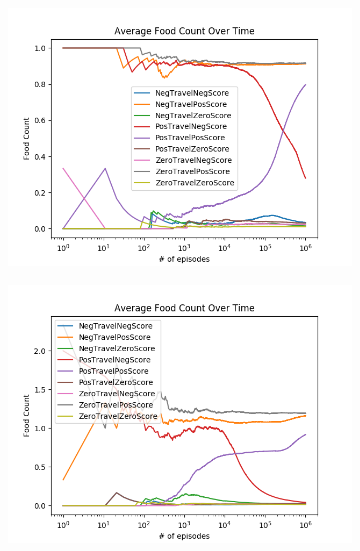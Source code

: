 \documentclass[result.tex]{subfiles}
\begin{document}
    \begin{figure}[ht]
        \centering
        \begin{subfigure}[b]{.35\linewidth}
            \includegraphics[width=\linewidth]{../images/sarsa/reward/234/board_state_average_food_count_over_time.png}
        \end{subfigure}
        \begin{subfigure}[b]{.35\linewidth}
            \includegraphics[width=\linewidth]{../images/sarsa/reward/234/directional_distance_state_average_food_count_over_time.png}
        \end{subfigure}


\end{figure}
\end{document}
